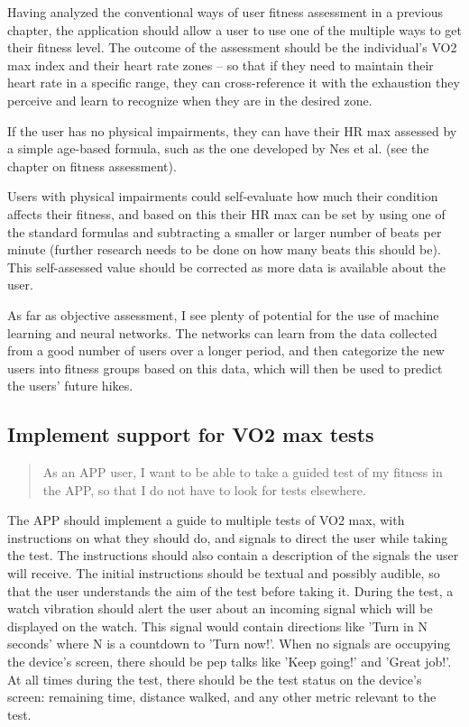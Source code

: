 Having analyzed the conventional ways of user fitness assessment in a previous chapter, the application should allow a user to use one of the multiple ways to get their fitness level.
The outcome of the assessment should be the individual's VO2 max index and their heart rate zones -- so that if they need to maintain their heart rate in a specific range, they can cross-reference it with the exhaustion they perceive and learn to recognize when they are in the desired zone.

If the user has no physical impairments, they can have their HR max assessed by a simple age-based formula, such as the one developed by Nes et al. (see the chapter on fitness assessment).

Users with physical impairments could self-evaluate how much their condition affects their fitness, and based on this their HR max can be set by using one of the standard formulas and subtracting a smaller or larger number of beats per minute (further research needs to be done on how many beats this should be).
This self-assessed value should be corrected as more data is available about the user.

As far as objective assessment, I see plenty of potential for the use of machine learning and neural networks.
The networks can learn from the data collected from a good number of users over a longer period, and then categorize the new users into fitness groups based on this data, which will then be used to predict the users' future hikes.

\subsection{Implement support for VO2 max tests}\label{US:fit-vo2max}
\begin{quote}
As an APP user, I want to be able to take a guided test of my fitness in the APP, so that I do not have to look for tests elsewhere.
\end{quote}

The APP should implement a guide to multiple tests of VO2 max, with instructions on what they should do, and signals to direct the user while taking the test.
The instructions should also contain a description of the signals the user will receive.
The initial instructions should be textual and possibly audible, so that the user understands the aim of the test before taking it.
During the test, a watch vibration should alert the user about an incoming signal which will be displayed on the watch.
This signal would contain directions like 'Turn in N seconds' where N is a countdown to 'Turn now!'.
When no signals are occupying the device's screen, there should be pep talks like 'Keep going!' and 'Great job!'.
At all times during the test, there should be the test status on the device's screen: remaining time, distance walked, and any other metric relevant to the test.

